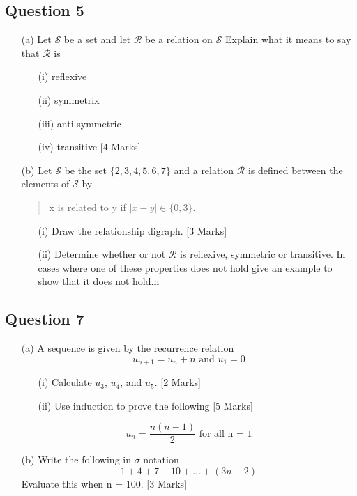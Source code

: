 \documentclass[a4paper,12pt]{article}
\begin{document}
\subsection*{Question 5}
\begin{itemize}
\item[(a)] Let $\mathcal{S}$ be a set and let $\mathcal{R}$ be a relation on $\mathcal{S}$
Explain what it means to say that $\mathcal{R}$ is

\begin{itemize}
\item[(i)] reflexive
\item[(ii)] symmetrix
\item[(iii)] anti-symmetric
\item[(iv)] transitive [4 Marks]
\end{itemize}

\item[(b)]  Let $\mathcal{S}$ be the set $\{2,3,4,5,6,7\}$ and a relation $\mathcal{R}$ is defined between the elements of $\mathcal{S}$ by
    \begin{center}
\begin{quote}
x is related to y if $|x - y| \in \{0,3\}$.
\end{quote}
\end{center}
\begin{itemize}
\item[(i)] Draw the relationship digraph. [3 Marks]
\item[(ii)] Determine whether or not $\mathcal{R}$ is reflexive, symmetric or transitive. In cases
where one of these properties does not hold give an example to show that
it does not hold.n \newline [3 Marks]
\end{itemize}
\end{itemize}
\newpage

\subsection*{Question 7}

\begin{itemize}
\item[(a)] A sequence is given by the recurrence relation
\[u_{n+1} = u_n + n \mbox{ and }u_1 = 0\]
\begin{itemize}
\item[(i)] Calculate $u_3$, $u_4$, and $u_5$. [2 Marks]
\item[(ii)] Use induction to prove the following [5 Marks]
\end{itemize}
\[u_n = \frac{n(n-1)}{2} \mbox{ for all n = 1} \]

\item[(b)] Write the following in $\sigma$ notation
\[ 1 + 4 + 7 + 10 + \ldots + (3n - 2)\]
Evaluate this when n = 100. [3 Marks]
\end{itemize}
\end{document}
